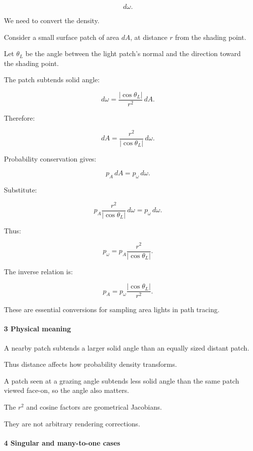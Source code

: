 \[
 d\omega.
\]

We need to convert the density.

Consider a small surface patch of area \(dA\), at distance \(r\) from the shading point.

Let \(\theta_L\) be the angle between the light patch's normal and the direction toward the shading point.

The patch subtends solid angle:

\[
 \boxed{ d\omega= \frac{|\cos\theta_L|}{r^2}\,dA }.
\]

Therefore:

\[
 dA= \frac{r^2}{|\cos\theta_L|}\,d\omega.
\]

Probability conservation gives:

\[
 p_A\,dA=p_\omega\,d\omega.
\]

Substitute:

\[
 p_A\frac{r^2}{|\cos\theta_L|}\,d\omega = p_\omega\,d\omega.
\]

Thus:

\[
 \boxed{ p_\omega= p_A\frac{r^2}{|\cos\theta_L|} }.
\]

The inverse relation is:

\[
 \boxed{ p_A= p_\omega\frac{|\cos\theta_L|}{r^2} }.
\]

These are essential conversions for sampling area lights in path tracing.

\paragraph{3 Physical meaning}\label{02-foundations-ii-ch029-physical-meaning}

\hypertarget{02-foundations-ii-ch029-physical-meaning}{}

A nearby patch subtends a larger solid angle than an equally sized distant patch.

Thus distance affects how probability density transforms.

A patch seen at a grazing angle subtends less solid angle than the same patch viewed face-on, so the angle also matters.

The \(r^2\) and cosine factors are geometrical Jacobians.

They are not arbitrary rendering corrections.

\paragraph{4 Singular and many-to-one cases}\label{02-foundations-ii-ch029-singular-and-many-to-one-cases}

